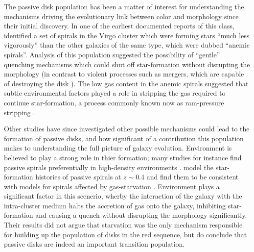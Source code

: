 The passive disk population has been a matter of interest for understanding the mechanisms driving the evolutionary link between color and morphology since their initial discovery.  In one of the earliest documented reports of this class, \citet{VandenBergh1976} identified a set of spirals in the Virgo cluster which were forming stars ``much less vigorously'' than the other galaxies of the same type, which were dubbed ``anemic spirals''. Analysis of this population suggested the possibility of ``gentle'' quenching mechanisms which could shut off star-formation without disrupting the morphology (in contrast to violent processes such as mergers, which are capable of destroying the disk \citep{Bell2004,Negroponte1983,DeLucia2006,Springel2005}). The low gas content in the anemic spirals suggested that subtle environmental factors played a role in stripping the gas required to continue star-formation, a process commonly known now as ram-pressure stripping \citep{Gunn1972,Steinhauser2016}. 

Other studies have since investigated other possible mechanisms could lead to the formation of passive disks, and how significant of a contribution this population makes to understanding the full picture of galaxy evolution. Environment is believed to play a strong role in thier formation; many studies for instance find passive spirals preferentially in high-density environments \citep{Dressler1999, Poggianti1999, Goto2003, Deng2009, Hughes2009}. \citet{Moran2006} model the star-formation histories of passive spirals at $z\sim0.4$ and find them to be consistent with models for spirals affected by gas-starvation \citep{Larson1980, Quilis2000, Bekki2002}. Environment plays a significant factor in this scenerio, wherby the interaction of the galaxy with the intra-cluster medium halts the accretion of gas onto the galaxy, inhibiting star-formation and causing a quench without disrupting the morphology significantly. Their results did not argue that starvation was the only mechanism responsible for building up the population of disks in the red sequence, but do conclude that passive disks are indeed an important transition population.

